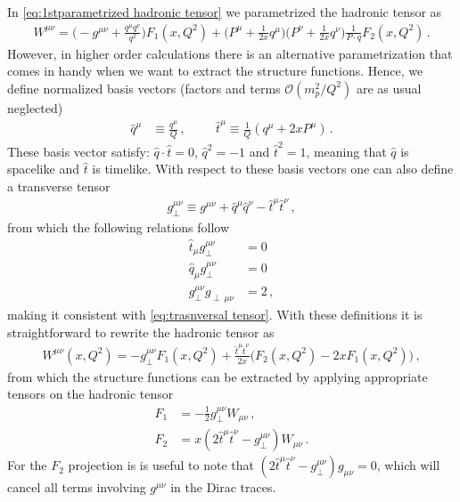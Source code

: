 In \cref{eq:1stparametrized hadronic tensor} we parametrized the hadronic tensor as
\begin{align}
    W^{\mu\nu}=\Big(-g^{\mu\nu}+\frac{q^{\mu}q^{\nu}}{q^{2}}\Big)F_{1}(x,Q^{2})+\Big(P^{\mu}+\frac{1}{2x}q^{\mu}\Big)\Big(P^{\nu}+\frac{1}{2x}q^{\nu}\Big)\frac{1}{P\cdot q}F_{2}(x,Q^{2})\,.
\end{align}
However, in higher order calculations there is an alternative parametrization that comes in handy when we want to extract the structure functions. Hence, we define normalized basis vectors (factors and terms $\mathcal{O}(m_{p}^{2}/Q^{2})$ are as usual neglected)
\begin{align}\label{eq:basis vectors}
    \hat{q}^{\mu}&\equiv\frac{q^{\mu}}{Q}\, ,\hspace{1cm}\hat{t}^{\mu}\equiv\frac{1}{Q}(q^{\mu}+2xP^{\mu})\,.
\end{align}
These basis vector satisfy: $\hat{q}\cdot\hat{t}=0$, $\hat{q}^{2}=-1$ and $\hat{t}^{2}=1$, meaning that $\hat{q}$ is spacelike and $\hat{t}$ is timelike. With respect to these basis vectors one can also define a transverse tensor
\begin{align}
    g_{\perp}^{\mu\nu}\equiv g^{\mu\nu}+\hat{q}^{\mu}\hat{q}^{\nu}-\hat{t}^{\mu}\hat{t}^{\nu}\,,
\end{align}
from which the following relations follow
\begin{align}
    \hat{t}_{\mu}g_{\perp}^{\mu\nu}&=0
    \\
    \hat{q}_{\mu}g_{\perp}^{\mu\nu}&=0
    \\
    g_{\perp}^{\mu\nu}g_{\perp\,\mu\nu}&=2\,,
\end{align}
making it consistent with \cref{eq:trasnversal tensor}. With these definitions it is straightforward to rewrite the hadronic tensor as
\begin{align}\label{eq:2ndparametrized hadronic tensor}
    W^{\mu\nu}(x,Q^{2})=-g_{\perp}^{\mu\nu}F_{1}(x,Q^{2})+\frac{\hat{t}^{\mu}\hat{t}^{\nu}}{2x}\big(F_{2}(x,Q^{2})-2xF_{1}(x,Q^{2})\big)\,,
\end{align}
from which the structure functions can be extracted by applying appropriate tensors on the hadronic tensor
\begin{align}
    F_{1}&=-\frac{1}{2}g_{\perp}^{\mu\nu}W_{\mu\nu}\,,\label{eq:extracting F_1}
    \\
    F_{2}&=x(2\hat{t}^{\mu}\hat{t}^{\nu}-g_{\perp}^{\mu\nu})W_{\mu\nu}\,.\label{eq:extracting F_2}
\end{align}
For the $F_{2}$ projection is is useful to note that $(2\hat{t}^{\mu}\hat{t}^{\nu}-g_{\perp}^{\mu\nu})g_{\mu\nu}=0$, which will cancel all terms involving $g^{\mu\nu}$ in the Dirac traces. 

